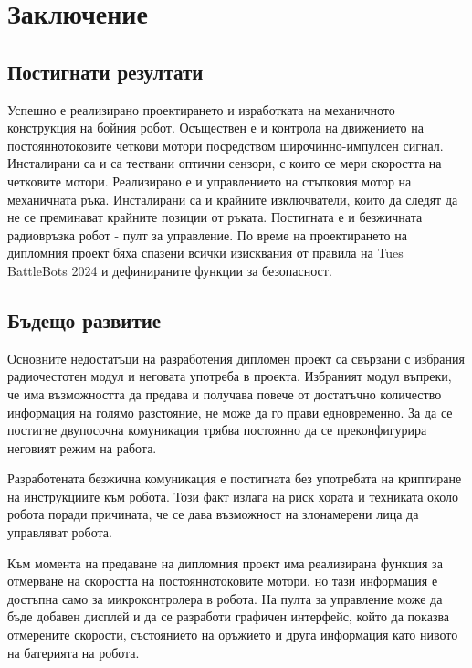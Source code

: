 \chapter{Заключение}

\section{Постигнати резултати}

Успешно е реализирано проектирането и изработката на механичното конструкция на бойния робот. Осъществен е и контрола на движението на постояннотоковите четкови мотори посредством широчинно-импулсен сигнал. Инсталирани са и са тествани оптични сензори, с които се мери скоростта на четковите мотори. Реализирано е и управлението на стъпковия мотор на механичната ръка. Инсталирани са и крайните изключватели, които да следят да не се преминават крайните позиции от ръката. Постигната е и безжичната радиовръзка робот - пулт за управление. По време на проектирането на дипломния проект бяха спазени всички изисквания от правила на Tues BattleBots 2024 и дефинираните функции за безопасност.

\section{Бъдещо развитие}

Основните недостатъци на разработения дипломен проект са свързани с избрания радиочестотен модул и неговата употреба в проекта. Избраният модул въпреки, че има възможността да предава и получава повече от достатъчно количество информация на голямо разстояние, не може да го прави едновременно. За да се постигне двупосочна комуникация трябва постоянно да се преконфигурира неговият режим на работа. 

Разработената безжична комуникация е постигната без употребата на криптиране на инструкциите към робота. Този факт излага на риск хората и техниката около робота поради причината, че се дава възможност на злонамерени лица да управляват робота.

Към момента на предаване на дипломния проект има реализирана функция за отмерване на скоростта на постояннотоковите мотори, но тази информация е достъпна само за микроконтролера в робота. На пулта за управление може да бъде добавен дисплей и да се разработи графичен интерфейс, който да показва отмерените скорости, състоянието на оръжието и друга информация като нивото на батерията на робота.

